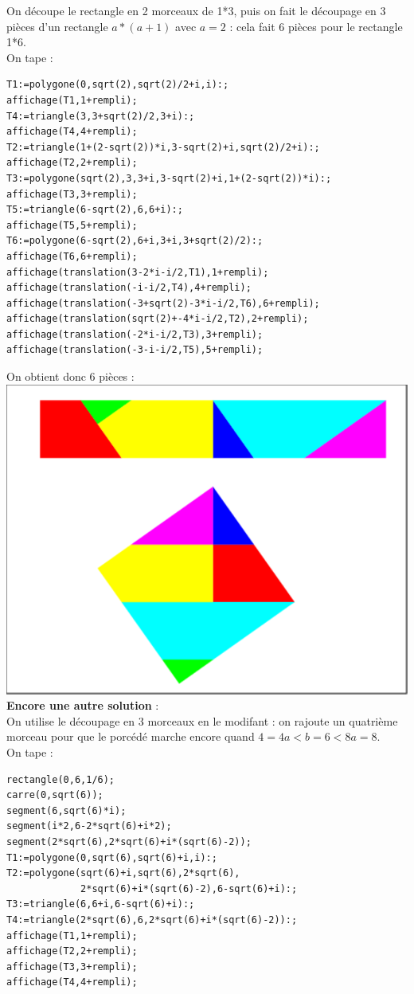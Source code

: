 \documentclass[a4paper,11pt]{book}
\begin{document}
On d\'ecoupe le rectangle en 2 morceaux de 1*3, puis on fait le d\'ecoupage 
en 3 pi\`eces d'un rectangle $a*(a+1)$ avec $a=2$ : cela fait 6 pi\`eces pour 
le rectangle 1*6.\\
 On tape :
\begin{verbatim}
T1:=polygone(0,sqrt(2),sqrt(2)/2+i,i):;
affichage(T1,1+rempli);
T4:=triangle(3,3+sqrt(2)/2,3+i):;
affichage(T4,4+rempli);
T2:=triangle(1+(2-sqrt(2))*i,3-sqrt(2)+i,sqrt(2)/2+i):;
affichage(T2,2+rempli);
T3:=polygone(sqrt(2),3,3+i,3-sqrt(2)+i,1+(2-sqrt(2))*i):;
affichage(T3,3+rempli);
T5:=triangle(6-sqrt(2),6,6+i):;
affichage(T5,5+rempli);
T6:=polygone(6-sqrt(2),6+i,3+i,3+sqrt(2)/2):;
affichage(T6,6+rempli);
affichage(translation(3-2*i-i/2,T1),1+rempli);
affichage(translation(-i-i/2,T4),4+rempli);
affichage(translation(-3+sqrt(2)-3*i-i/2,T6),6+rempli);
affichage(translation(sqrt(2)+-4*i-i/2,T2),2+rempli);
affichage(translation(-2*i-i/2,T3),3+rempli);
affichage(translation(-3-i-i/2,T5),5+rempli);
\end{verbatim}
On obtient donc 6 pi\`eces :\\
\includegraphics[width=\textwidth]{carresqrt62}
{\bf Encore une autre solution} : \\
On utilise le d\'ecoupage en 3 morceaux en le modifant : on rajoute un 
quatri\`eme morceau pour que le porc\'ed\'e marche encore quand $4=4a<b=6<8a=8$.\\
On tape :
\begin{verbatim}
rectangle(0,6,1/6);
carre(0,sqrt(6));
segment(6,sqrt(6)*i);
segment(i*2,6-2*sqrt(6)+i*2);
segment(2*sqrt(6),2*sqrt(6)+i*(sqrt(6)-2));
T1:=polygone(0,sqrt(6),sqrt(6)+i,i):;
T2:=polygone(sqrt(6)+i,sqrt(6),2*sqrt(6),
             2*sqrt(6)+i*(sqrt(6)-2),6-sqrt(6)+i):;
T3:=triangle(6,6+i,6-sqrt(6)+i):;
T4:=triangle(2*sqrt(6),6,2*sqrt(6)+i*(sqrt(6)-2)):;
affichage(T1,1+rempli);
affichage(T2,2+rempli);
affichage(T3,3+rempli);
affichage(T4,4+rempli);
\end{verbatim}
\end{document}
